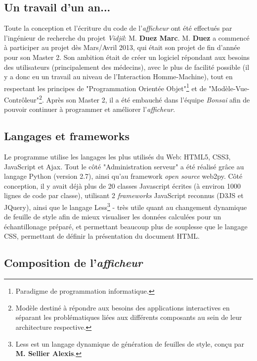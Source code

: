 \documentclass[12pt]{report}
\begin{document}
\begin{spacing}{1.2}
\subsection{Un travail d'un an...}
Toute la conception et l'écriture du code de l'\textit{afficheur} ont été effectués par l'ingénieur de recherche du projet \textit{Vidjil}: M. \textbf{Duez Marc}.
\newline
M. \textbf{Duez} a commencé à participer au projet dès Mars/Avril 2013, qui était son projet de fin d'année pour son Master 2.
\newline
Son ambition était de créer un logiciel répondant aux besoins des utilisateurs (principalement des médecins), avec le plus de facilité possible (il y a donc eu un travail au niveau de l'Interaction Homme-Machine), tout en respectant les principes de "Programmation Orientée Objet"\footnote{Paradigme de programmation informatique.} et de "Modèle-Vue-Contrôleur"\footnote{Modèle destiné à répondre aux besoins des applications interactives en séparant les problématiques liées aux différents composants au sein de leur architecture respective.}.
\newline
Après son Master 2, il a été embauché dans l'équipe \textit{Bonsai} afin de pouvoir continuer à programmer et améliorer l'\textit{afficheur}.

\subsection{Langages et frameworks}
Le programme utilise les langages les plus utilisés du Web: HTML5, CSS3, JavaScript et Ajax.
\newline
Tout le côté "Administration serveur" a été réalisé grâce au langage Python (version 2.7), ainsi qu'au framework \textit{open source} web2py.
\newline
Côté conception, il y avait déjà plus de 20 classes Javascript écrites (à environ 1000 lignes de code par classe), utilisant 2 \textit{frameworks} JavaScript reconnus (D3JS et JQuery), ainsi que le langage Less\footnote{Less est un langage dynamique de génération de feuilles de style, conçu par \textbf{M. Sellier Alexis}.} - très utile quant au changement dynamique de feuille de style afin de mieux visualiser les données calculées pour un échantillonage préparé, et permettant beaucoup plus de souplesse que le langage CSS, permettant de définir la présentation du document HTML.

\subsection{Composition de l'\textit{afficheur}}


\end{spacing}
\end{document}
